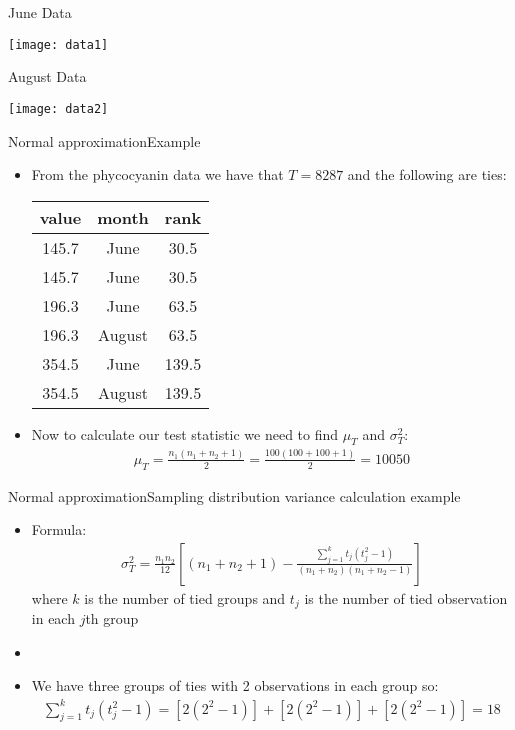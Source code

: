\documentclass[xcolor=dvipsnames]{beamer}
\begin{document}
\begin{frame}{June Data}
	\begin{center}
		\texttt{[image: data1]}
	\end{center}
\end{frame}

\begin{frame}{August Data}
	\begin{center}
		\texttt{[image: data2]}
	\end{center}
\end{frame}

\begin{frame}{Normal approximation}{Example}
	\begin{itemize}
		\item From the phycocyanin data we have that $T = 8287$ and the following are ties: 
		\begin{center}
			\begin{tabular}{|c|c|c|}
					\hline
				  \textbf{value} & \textbf{month}&  \textbf{rank} \\ \hline \hline
				 145.7  & June &  30.5\\ \hline
				 145.7  & June &  30.5\\ \hline
				 196.3  & June &  63.5\\ \hline
				 196.3 &August &  63.5\\ \hline
				 354.5 &  June & 139.5\\ \hline
				 354.5& August & 139.5\\ \hline
			\end{tabular}
		\end{center} \pause
	\item Now to calculate our test statistic we need to find $\mu_T$ and $\sigma_T^2$:
	\begin{align*}
		\mu_T = \frac{n_1 (n_1 + n_2 + 1)}{2} = \frac{100(100+100+1)}{2} = 10050
	\end{align*}
	\end{itemize}
\end{frame}

\begin{frame}{Normal approximation}{Sampling distribution variance calculation example}
\begin{itemize}
	\item Formula: 	
	\begin{gather*}
	\sigma_T^{2} = \frac{n_1 n_2}{12}\left[(n_1 +n_2 +1)- \frac{\sum_{j=1}^k t_j (t_j^2-1)}{(n_1+n_2)(n_1+n_2-1)} \right]
	\end{gather*}
	where $k$ is the number of tied groups and $t_j$ is the number of tied observation in each $j$th group \pause
	\item[]
	\item We have three groups of ties with 2 observations in each group so:
	\begin{gather*}
		\sum_{j=1}^k t_j (t_j^2-1) =  [2(2^2 -1)] + [2(2^2 -1)] + [2(2^2 -1)] = 18
	\end{gather*}
\end{itemize}
\end{frame}
\end{document}
